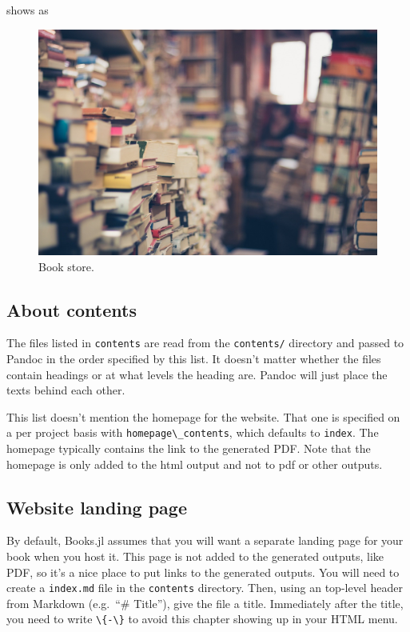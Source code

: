 \documentclass[
  notoc %
]{tufte-book}
\newcommand{\passthrough}[1]{#1}
\begin{document}
shows as

\begin{figure}
\hypertarget{fig:store}{%
\centering
\includegraphics{images/book-store.jpg}
\caption{Book store.}\label{fig:store}
}
\end{figure}

\hypertarget{sec:about_contents}{%
\subsection{About contents}\label{sec:about_contents}}

The files listed in \passthrough{\lstinline!contents!} are read from the
\passthrough{\lstinline!contents/!} directory and passed to Pandoc in
the order specified by this list. It doesn't matter whether the files
contain headings or at what levels the heading are. Pandoc will just
place the texts behind each other.

This list doesn't mention the homepage for the website. That one is
specified on a per project basis with
\passthrough{\lstinline!homepage\_contents!}, which defaults to
\passthrough{\lstinline!index!}. The homepage typically contains the
link to the generated PDF. Note that the homepage is only added to the
html output and not to pdf or other outputs.

\hypertarget{website-landing-page}{%
\subsection{Website landing page}\label{website-landing-page}}

By default, Books.jl assumes that you will want a separate landing page
for your book when you host it. This page is not added to the generated
outputs, like PDF, so it's a nice place to put links to the generated
outputs. You will need to create a \passthrough{\lstinline!index.md!}
file in the \passthrough{\lstinline!contents!} directory. Then, using an
top-level header from Markdown (e.g.~``\# Title''), give the file a
title. Immediately after the title, you need to write
\passthrough{\lstinline!\{-\}!} to avoid this chapter showing up in your
HTML menu.
\end{document}
